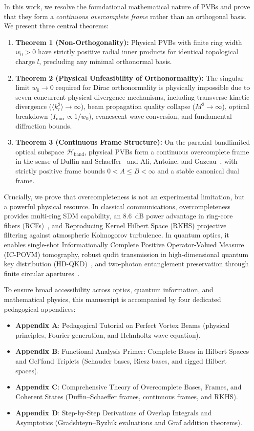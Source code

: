 \documentclass[11pt,a4paper]{article}
\begin{document}
In this work, we resolve the foundational mathematical nature of PVBs and prove that they form a \emph{continuous overcomplete frame} rather than an orthogonal basis. We present three central theorems:
\begin{enumerate}
    \item \textbf{Theorem 1 (Non-Orthogonality):} Physical PVBs with finite ring width $w_0 > 0$ have strictly positive radial inner products for identical topological charge $l$, precluding any minimal orthonormal basis.
    \item \textbf{Theorem 2 (Physical Unfeasibility of Orthonormality):} The singular limit $w_0 \to 0$ required for Dirac orthonormality is physically impossible due to seven concurrent physical divergence mechanisms, including transverse kinetic divergence ($\langle k_r^2 \rangle \to \infty$), beam propagation quality collapse ($M^2 \to \infty$), optical breakdown ($I_{\max} \propto 1/w_0$), evanescent wave conversion, and fundamental diffraction bounds.
    \item \textbf{Theorem 3 (Continuous Frame Structure):} On the paraxial bandlimited optical subspace $\mathcal{H}_{\text{band}}$, physical PVBs form a continuous overcomplete frame in the sense of Duffin and Schaeffer~\cite{Duffin1952} and Ali, Antoine, and Gazeau~\cite{Ali1993}, with strictly positive frame bounds $0 < A \le B < \infty$ and a stable canonical dual frame.
\end{enumerate}

Crucially, we prove that overcompleteness is not an experimental limitation, but a powerful physical resource. In classical communications, overcompleteness provides multi-ring SDM capability, an 8.6~dB power advantage in ring-core fibers (RCFs)~\cite{Villalba2023}, and Reproducing Kernel Hilbert Space (RKHS) projective filtering against atmospheric Kolmogorov turbulence. In quantum optics, it enables single-shot Informationally Complete Positive Operator-Valued Measure (IC-POVM) tomography, robust qudit transmission in high-dimensional quantum key distribution (HD-QKD)~\cite{Cerf2002,Mirhosseini2015}, and two-photon entanglement preservation through finite circular apertures~\cite{Clauser1969}.

To ensure broad accessibility across optics, quantum information, and mathematical physics, this manuscript is accompanied by four dedicated pedagogical appendices:
\begin{itemize}
    \item \textbf{Appendix A}: Pedagogical Tutorial on Perfect Vortex Beams (physical principles, Fourier generation, and Helmholtz wave equation).
    \item \textbf{Appendix B}: Functional Analysis Primer: Complete Bases in Hilbert Spaces and Gel'fand Triplets (Schauder bases, Riesz bases, and rigged Hilbert spaces).
    \item \textbf{Appendix C}: Comprehensive Theory of Overcomplete Bases, Frames, and Coherent States (Duffin--Schaeffer frames, continuous frames, and RKHS).
    \item \textbf{Appendix D}: Step-by-Step Derivations of Overlap Integrals and Asymptotics (Gradshteyn--Ryzhik evaluations and Graf addition theorems).
\end{itemize}
\end{document}
